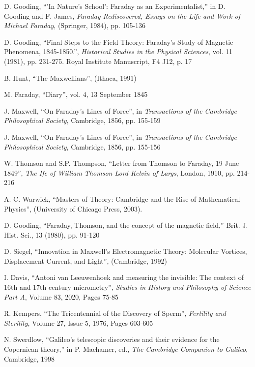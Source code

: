 \documentclass{article}
\begin{document}
\begin{thebibliography}{99}
	D. Gooding, “’In Nature’s School’: Faraday as an Experimentalist,” in D. Gooding and F. James, \emph{Faraday Rediscovered, Essays on the Life and Work of Michael Faraday}, (Springer, 1984), pp. 105-136

	D. Gooding, “Final Steps to the Field Theory: Faraday's Study of Magnetic Phenomena, 1845-1850.”,  \emph{Historical Studies in the  Physical Sciences}, vol. 11 (1981), pp. 231-275.
	Royal Institute Manuscript, F4 J12, p. 17

	B. Hunt, ``The Maxwellians'', (Ithaca, 1991)

	M. Faraday, ``Diary'', vol. 4, 13 September 1845

J. Maxwell, “On Faraday's Lines of Force”, in \emph{Transactions of the Cambridge Philosophical Society}, Cambridge, 1856, pp. 155-159

	J. Maxwell, “On Faraday's Lines of Force”, in \emph{Transactions of the Cambridge Philosophical Society}, Cambridge, 1856, pp. 155-156

W. Thomson and S.P. Thompson, ``Letter from Thomson to Faraday, 19 June 1849'', \emph{The Ife of William Thomson Lord Kelvin of Largs}, London, 1910, pp. 214-216

	A. C. Warwick, ``Masters of Theory: Cambridge and the Rise of Mathematical Physics'', (University of Chicago Press, 2003).

	D. Gooding, “Faraday, Thomson, and the concept of the magnetic field,” Brit. J. Hist. Sci., 13 (1980), pp. 91-120

	D. Siegel, ``Innovation in Maxwell's Electromagnetic Theory: Molecular Vortices, Displacement Current, and Light'', (Cambridge, 1992)

	I. Davis, ``Antoni van Leeuwenhoek and measuring the invisible: The context of 16th and 17th century micrometry'', \emph{Studies in History and Philosophy of Science Part A}, Volume 83, 2020, Pages 75-85

	R. Kempers, ``The Tricentennial of the Discovery of Sperm'', \emph{Fertility and Sterility}, Volume 27, Issue 5, 1976, Pages 603-605

	N. Swerdlow, “Galileo’s telescopic discoveries and their evidence for the Copernican theory,” in P. Machamer, ed., \emph{The Cambridge Companion to Galileo}, Cambridge, 1998


\end{thebibliography}
\end{document}
